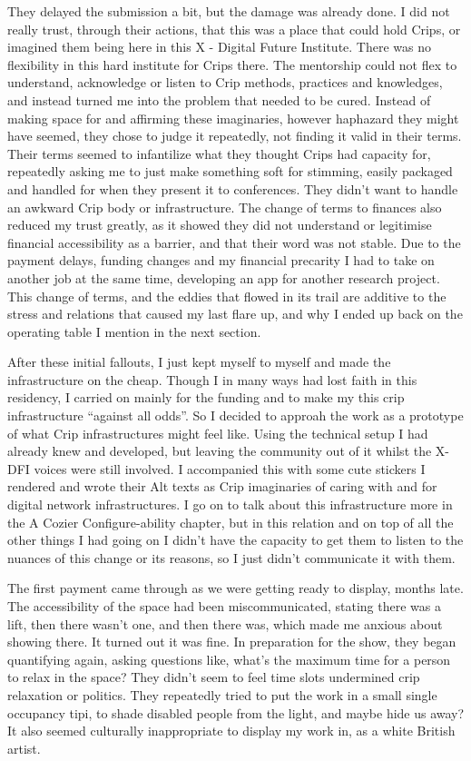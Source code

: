 They delayed the submission a bit, but the damage was already done. I
did not really trust, through their actions, that this was a place that
could hold Crips, or imagined them being here in this X - Digital Future
Institute. There was no flexibility in this hard institute for Crips
there. The mentorship could not flex to understand, acknowledge or
listen to Crip methods, practices and knowledges, and instead turned me
into the problem that needed to be cured. Instead of making space for
and affirming these imaginaries, however haphazard they might have
seemed, they chose to judge it repeatedly, not finding it valid in their
terms. Their terms seemed to infantilize what they thought Crips had
capacity for, repeatedly asking me to just make something soft for
stimming, easily packaged and handled for when they present it to
conferences. They didn't want to handle an awkward Crip body or
infrastructure. The change of terms to finances also reduced my trust
greatly, as it showed they did not understand or legitimise financial
accessibility as a barrier, and that their word was not stable. Due to
the payment delays, funding changes and my financial precarity I had to
take on another job at the same time, developing an app for another
research project. This change of terms, and the eddies that flowed in
its trail are additive to the stress and relations that caused my last
flare up, and why I ended up back on the operating table I mention in
the next section.

After these initial fallouts, I just kept myself to myself and made the
infrastructure on the cheap. Though I in many ways had lost faith in
this residency, I carried on mainly for the funding and to make my this
crip infrastructure ``against all odds''. So I decided to approah the
work as a prototype of what Crip infrastructures might feel like. Using
the technical setup I had already knew and developed, but leaving the
community out of it whilst the X-DFI voices were still involved. I
accompanied this with some cute stickers I rendered and wrote their Alt
texts as Crip imaginaries of caring with and for digital network
infrastructures. I go on to talk about this infrastructure more in the A
Cozier Configure-ability chapter, but in this relation and on top of all
the other things I had going on I didn't have the capacity to get them
to listen to the nuances of this change or its reasons, so I just didn't
communicate it with them.

The first payment came through as we were getting ready to display,
months late. The accessibility of the space had been miscommunicated,
stating there was a lift, then there wasn't one, and then there was,
which made me anxious about showing there. It turned out it was fine. In
preparation for the show, they began quantifying again, asking questions
like, what's the maximum time for a person to relax in the space? They
didn't seem to feel time slots undermined crip relaxation or politics.
They repeatedly tried to put the work in a small single occupancy tipi,
to shade disabled people from the light, and maybe hide us away? It also
seemed culturally inappropriate to display my work in, as a white
British artist.

